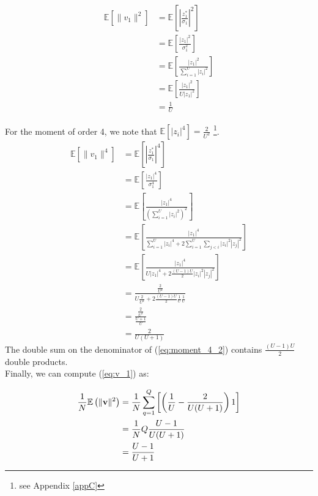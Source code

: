 \begin{subequations}
\begin{align}
\mathbb{E} \left[ \| v_1\|^2 \right] &= \mathbb{E}\left[ \left| \frac{z_1^*}{\sigma_1}\right|^2\right]  \\
& =  \mathbb{E} \left[ \frac{\left| z_1 \right|^2 }{\sigma_1^2} \right] \\
&=  \mathbb{E} \left[   \frac{\left| z_1 \right|^2 }{  \sum_{i=1}^{U} \left| z_i\right|^2 }  \right] \\
& = \mathbb{E} \left[   \frac{\left| z_1 \right|^2 }{  U \left| z_1 \right|^2 }  \right] \\
& = \frac{1}{U}
\end{align}
\end{subequations}

For the moment of order 4, we note that $\mathbb{E}\left[ \left| z_i \right|^4\right] = \frac{2}{U^2}$ \footnote{see Appendix \ref{appC}}.
\begin{subequations}
\begin{align}
\mathbb{E} \left[ \| v_1\|^4 \right] &= \mathbb{E}\left[ \left| \frac{z_1^*}{\sigma_1}\right|^4\right] \\
& =  \mathbb{E} \left[ \frac{\left| z_1 \right|^4 }{\sigma_1^4} \right] \\
&=  \mathbb{E} \left[   \frac{\left| z_1 \right|^4 }{  \left( \sum_{i=1}^{U} \left| z_i\right|^2 \right)^2 }  \right] \label{eq:moment_4_1} \\
&= \mathbb{E} \left[   \frac{\left| z_1 \right|^4 }{  \sum_{i=1}^{U} \left| z_i\right|^4 + 2 \sum_{i=1}^{U} \sum_{j<i} \left|z_i\right|^2 \left|z_j\right|^2 }  \right] \label{eq:moment_4_2}\\
&= \mathbb{E} \left[   \frac{\left| z_1 \right|^4 }{ U \left| z_1\right|^4 + 2 \frac{(U-1)U}{2} \left|z_i\right|^2 \left|z_j\right|^2 }  \right] \\
& = \frac{\frac{2}{U^2}}{U\frac{2}{U^2} + 2 \frac{(U-1)U}{2} \frac{1}{U} \frac{1}{U}} \\
& =  \frac{\frac{2}{U^2}}{\frac{U+1}{U}} \\
&= \frac{2}{U(U+1)}
\end{align}
\end{subequations}
The double sum on the denominator of (\ref{eq:moment_4_2}) contains $\frac{(U-1)U}{2}$ double products.\\

Finally, we can compute (\ref{eq:v_1}) as:

\begin{subequations}
\begin{align}
\frac{1}{N}\mathbb{E}\left(\|\boldsymbol{\mathrm{v}}\|^2\right)&=\frac{1}{N} \sum_{q=1}^{Q} \left[ \left( \frac{1}{U} - \frac{2}{U(U+1)} \right) 1\right] \\
&= \frac{1}{N} Q \frac{U-1}{U(U+1)} \\
&= \frac{U-1}{U+1} \label{eq:final_an_result_no_correction}
\end{align}
\end{subequations}

